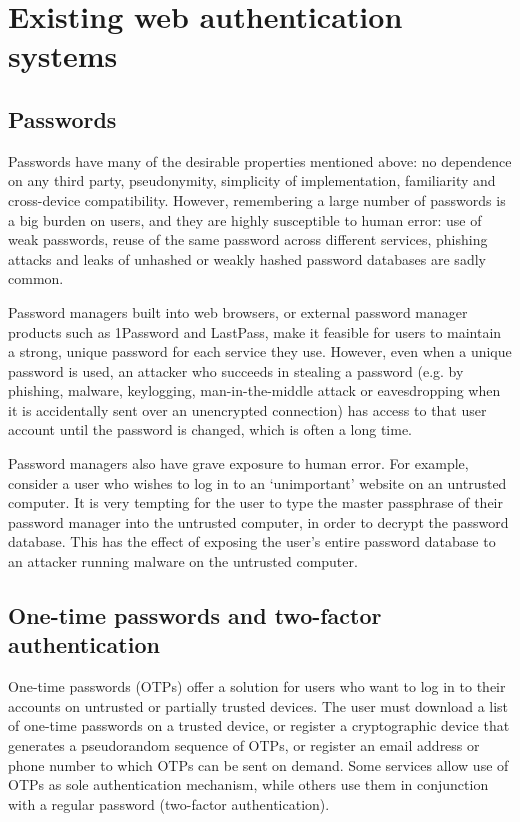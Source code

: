 \section{Existing web authentication systems}
\subsection{Passwords}

Passwords have many of the desirable properties mentioned above: no dependence on any third party,
pseudonymity, simplicity of implementation, familiarity and cross-device compatibility. However,
remembering a large number of passwords is a big burden on users, and they are highly susceptible to
human error: use of weak passwords, reuse of the same password across different services, phishing
attacks and leaks of unhashed or weakly hashed password databases are sadly common.

Password managers built into web browsers, or external password manager products such as 1Password
and LastPass, make it feasible for users to maintain a strong, unique password for each service they
use. However, even when a unique password is used, an attacker who succeeds in stealing a password
(e.g. by phishing, malware, keylogging, man-in-the-middle attack or eavesdropping when it is
accidentally sent over an unencrypted connection) has access to that user account until the password
is changed, which is often a long time.

Password managers also have grave exposure to human error. For example, consider a user who wishes
to log in to an `unimportant' website on an untrusted computer. It is very tempting for the user to
type the master passphrase of their password manager into the untrusted computer, in order to
decrypt the password database. This has the effect of exposing the user's entire password database
to an attacker running malware on the untrusted computer.

\subsection{One-time passwords and two-factor authentication}

One-time passwords (OTPs) offer a solution for users who want to log in to their accounts on
untrusted or partially trusted devices. The user must download a list of one-time passwords on a
trusted device, or register a cryptographic device that generates a pseudorandom sequence of OTPs,
or register an email address or phone number to which OTPs can be sent on demand. Some services
allow use of OTPs as sole authentication mechanism, while others use them in conjunction with a
regular password (two-factor authentication).

